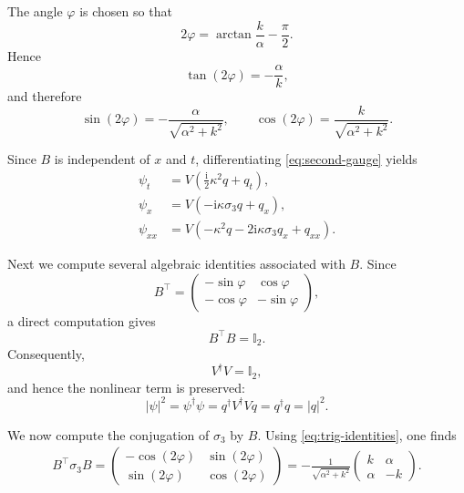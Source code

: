 \documentclass{amsart}
\numberwithin{equation}{hw}
\begin{document}
The angle $\varphi$ is chosen so that
\begin{equation}
2\varphi
=
\arctan\frac{k}{\alpha}-\frac{\pi}{2}.
\label{eq:phi-definition}
\end{equation}
Hence
\begin{equation}
\tan(2\varphi)
=
-\frac{\alpha}{k},
\end{equation}
and therefore
\begin{equation}
\sin(2\varphi)
=
-\frac{\alpha}{\sqrt{\alpha^2+k^2}},
\qquad
\cos(2\varphi)
=
\frac{k}{\sqrt{\alpha^2+k^2}}.
\label{eq:trig-identities}
\end{equation}

Since $B$ is independent of $x$ and $t$, differentiating
\eqref{eq:second-gauge} yields
\begin{align}
\psi_t
&=
V
\left(
\frac{\mathrm{i}}{2}\kappa^2q+q_t
\right),
\label{eq:psi-t-q}
\\
\psi_x
&=
V
\left(
-\mathrm{i}\kappa\sigma_3q+q_x
\right),
\label{eq:psi-x-q}
\\
\psi_{xx}
&=
V
\left(
-\kappa^2q
-2\mathrm{i}\kappa\sigma_3q_x
+q_{xx}
\right).
\label{eq:q-derivatives}
\end{align}

Next we compute several algebraic identities associated with $B$. Since
\begin{equation}
B^\top
=
\begin{pmatrix}
-\sin\varphi & \cos\varphi
\\
-\cos\varphi & -\sin\varphi
\end{pmatrix},
\end{equation}
a direct computation gives
\begin{equation}
B^\top B
=
\mathbb{I}_2.
\label{eq:B-orthogonal}
\end{equation}
Consequently,
\begin{equation}
V^\dagger V
=
\mathbb{I}_2,
\end{equation}
and hence the nonlinear term is preserved:
\begin{equation}
|\psi|^2
=
\psi^\dagger\psi
=
q^\dagger V^\dagger V q
=
q^\dagger q
=
|q|^2.
\label{eq:q-norm}
\end{equation}

We now compute the conjugation of $\sigma_3$ by $B$. Using
\eqref{eq:trig-identities}, one finds
\begin{align}
B^\top\sigma_3B
=
\begin{pmatrix}
-\cos(2\varphi) & \sin(2\varphi)
\\
\sin(2\varphi) & \cos(2\varphi)
\end{pmatrix}
=
-\frac{1}{\sqrt{\alpha^2+k^2}}
\begin{pmatrix}
k & \alpha
\\
\alpha & -k
\end{pmatrix}.
\label{eq:B-conjugation}
\end{align}
\end{document}
